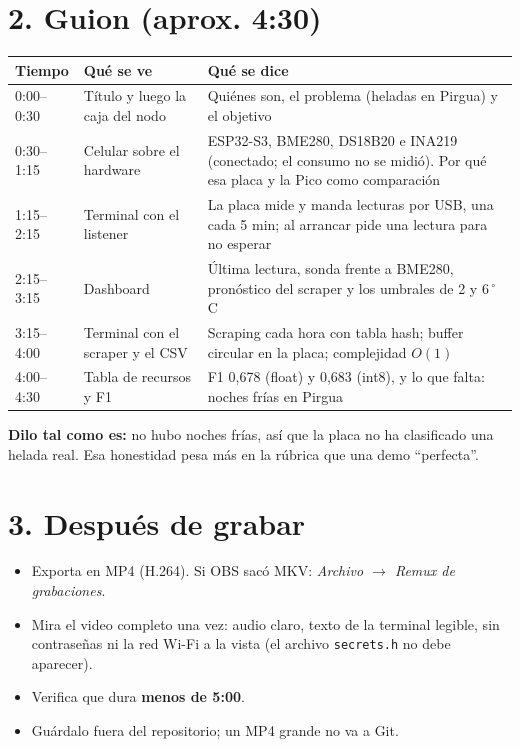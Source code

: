 \documentclass[11pt,a4paper]{article}
\begin{document}
\section*{2. Guion (aprox. 4:30)}
\begin{tabular}{@{}>{\raggedright}p{2.1cm}>{\raggedright}p{5.3cm}>{\raggedright\arraybackslash}p{8cm}@{}}
\toprule
Tiempo & Qu\'e se ve & Qu\'e se dice \\
\midrule
0:00--0:30 & T\'itulo y luego la caja del nodo & Qui\'enes son, el problema (heladas en Pirgua) y el objetivo \\
0:30--1:15 & Celular sobre el hardware & ESP32-S3, BME280, DS18B20 e INA219 (conectado; el consumo no se midi\'o). Por qu\'e esa placa y la Pico como comparaci\'on \\
1:15--2:15 & Terminal con el listener & La placa mide y manda lecturas por USB, una cada 5 min; al arrancar pide una lectura para no esperar \\
2:15--3:15 & Dashboard & \'Ultima lectura, sonda frente a BME280, pron\'ostico del scraper y los umbrales de 2 y 6\,$^\circ$C \\
3:15--4:00 & Terminal con el scraper y el CSV & Scraping cada hora con tabla hash; buffer circular en la placa; complejidad $O(1)$ \\
4:00--4:30 & Tabla de recursos y F1 & F1 0,678 (float) y 0,683 (int8), y lo que falta: noches fr\'ias en Pirgua \\
\bottomrule
\end{tabular}

\medskip
\textbf{Dilo tal como es:} no hubo noches fr\'ias, as\'i que la placa no ha clasificado una helada real. Esa honestidad pesa m\'as en la r\'ubrica que una demo ``perfecta''.

\section*{3. Despu\'es de grabar}
\begin{itemize}
\item Exporta en MP4 (H.264). Si OBS sac\'o MKV: \textit{Archivo $\rightarrow$ Remux de grabaciones}.
\item Mira el video completo una vez: audio claro, texto de la terminal legible, sin contrase\~nas ni la red Wi-Fi a la vista (el archivo \texttt{secrets.h} no debe aparecer).
\item Verifica que dura \textbf{menos de 5:00}.
\item Gu\'ardalo fuera del repositorio; un MP4 grande no va a Git.
\end{itemize}
\end{document}
